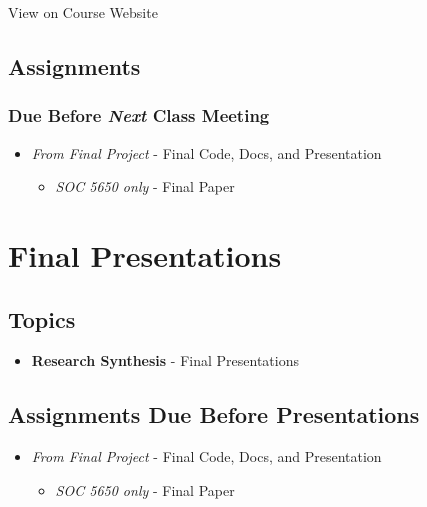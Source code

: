 \documentclass[
]{book}
\providecommand{\tightlist}{%
  \setlength{\itemsep}{0pt}\setlength{\parskip}{0pt}}
\begin{document}
View on Course Website

\hypertarget{assignments-18}{%
\subsection*{Assignments}\label{assignments-18}}

\hypertarget{due-before-next-class-meeting}{%
\subsubsection*{\texorpdfstring{Due Before \emph{Next} Class Meeting}{Due Before Next Class Meeting}}\label{due-before-next-class-meeting}}

\begin{itemize}
\tightlist
\item
  \emph{From Final Project} - Final Code, Docs, and Presentation

  \begin{itemize}
  \tightlist
  \item
    \emph{SOC 5650 only} - Final Paper
  \end{itemize}
\end{itemize}

\hypertarget{final-presentations}{%
\section*{Final Presentations}\label{final-presentations}}

\hypertarget{topics-17}{%
\subsection*{Topics}\label{topics-17}}

\begin{itemize}
\tightlist
\item
  \textbf{Research Synthesis} - Final Presentations
\end{itemize}

\hypertarget{assignments-due-before-presentations}{%
\subsection*{Assignments Due Before Presentations}\label{assignments-due-before-presentations}}

\begin{itemize}
\tightlist
\item
  \emph{From Final Project} - Final Code, Docs, and Presentation

  \begin{itemize}
  \tightlist
  \item
    \emph{SOC 5650 only} - Final Paper
  \end{itemize}
\end{itemize}

  
\end{document}
